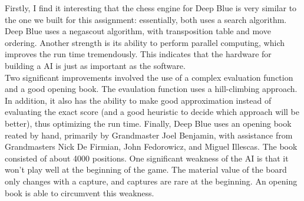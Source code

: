 \documentclass[9.5pt]{extarticle}
\begin{document}
Firstly, I find it interesting that the chess engine for Deep Blue is very similar to the one we built for this assignment: essentially, both uses a search algorithm. Deep Blue uses a negascout algorithm, with transposition table and move ordering. Another strength is its ability to perform parallel computing, which improves the run time tremendously. This indicates that the hardware for building a AI is just as important as the software.\\

Two significant improvements involved the use of a complex evaluation function and a good opening book. The evaulation function uses a hill-climbing approach. In addition, it also has the ability to make good approximation instead of evaluating the exact score (and a good heuristic to decide which approach will be better), thus optimizing the run time. Finally, Deep Blue uses an opening book reated by hand, primarily by Grandmaster Joel Benjamin, with assistance from Grandmasters Nick De Firmian, John Fedorowicz, and Miguel Illescas. The book consisted of about 4000 positions. One significant weakness of the AI is that it won't play well at the beginning of the game. The material value of the board only changes with a capture, and captures are rare at the beginning. An opening book is able to circumvent this weakness.\\
\end{document}
